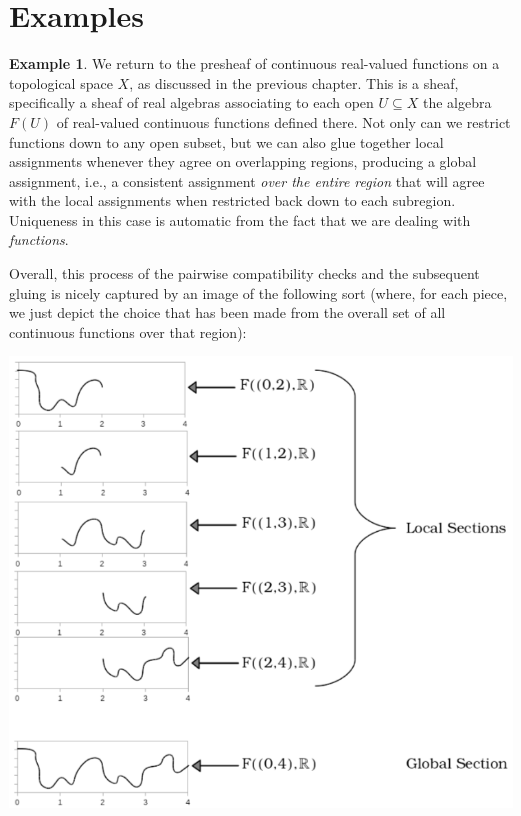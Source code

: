 \documentclass[a4paper]{book}
\theoremstyle{definition}
\newtheorem{example}{Example}[section]
\theoremstyle{definition}
\theoremstyle{definition}
\theoremstyle{theorem}
\theoremstyle{definition}
\begin{document}
	\section{Examples}
	\begin{example}
		We return to the presheaf of continuous real-valued functions on a topological space $X$, as discussed in the previous chapter. This is a sheaf, specifically a sheaf of real algebras associating to each open $U \subseteq  X$ the algebra $F(U)$ of real-valued continuous functions defined there. Not only can we restrict functions down to any open subset, but we can also glue together local assignments whenever they agree on overlapping regions, producing a global assignment, i.e., a consistent assignment \textit{over the entire region} that will agree with the local assignments when restricted back down to each subregion. Uniqueness in this case is automatic from the fact that we are dealing with \textit{functions}. \par 
		Overall, this process of the pairwise compatibility checks and the subsequent gluing is nicely captured by an image of the following sort (where, for each piece, we just depict the choice that has been made from the overall set of all continuous functions over that region):      
		\begin{center}  
		\includegraphics[scale=0.45]{SheafofContinuousFunctions.png}
		\end{center} 
	\end{example}
\end{document}
